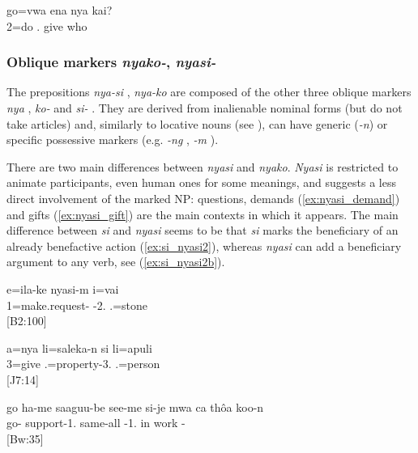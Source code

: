 	\ea \label{ex:nyakai}
	\gll go=vwa ena nya kai?\\
	 2=do . give who\\
	\glt {}
	\z

\subsubsection{Oblique markers \textit{nyako-}, \textit{nyasi-}}
\label{ssec:nyako}
The prepositions \textit{nya-si} , \textit{nya-ko}  are composed of the other three oblique markers \textit{nya} , \textit{ko-}  and \textit{si-} . 
They are derived from inalienable nominal forms (but do not take articles) and, similarly to locative nouns (see ), can have generic (\textit{-n}) or specific possessive markers (e.g. \textit{-ng} , \textit{-m} ).
 
There are two main differences between \textit{nyasi} and \textit{nyako}. \textit{Nyasi} is restricted to animate participants, even human ones for some meanings, and suggests a less direct involvement of the marked NP: questions, demands (\ref{ex:nyasi_demand}) and gifts (\ref{ex:nyasi_gift}) are the main contexts in which it appears. The main difference between \textit{si} and \textit{nyasi} seems to be that \textit{si} marks the beneficiary of an already benefactive action (\ref{ex:si_nyasi2}), whereas \textit{nyasi} can add a beneficiary argument to any verb, see (\ref{ex:si_nyasi2b}).


\ea\label{ex:nyasi_demand}
\gll e=ila-ke nyasi-m i=vai\\
 1=make.request- -2. .=stone\\
\glt {} {[B2:100]}
\z


\ea\label{ex:nyasi_gift}
\gll a=nya li=saleka-n si li=apuli\\
 3=give .=property-3.  .=person\\
\glt {} {[J7:14]}
\z


\ea
\label{ex:si_nyasi2}
\gll go ha-me saaguu-be see-me si-je mwa ca thôa koo-n\\
  go- support-1. same-all -1.  in work -\\
\glt {} {[Bw:35]}
\z

